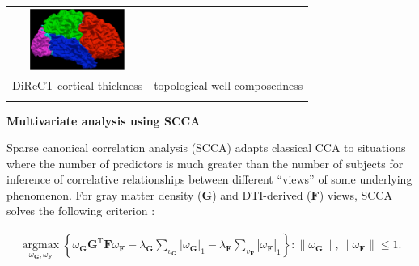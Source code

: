 \documentclass[paperwidth=48in,paperheight=48in,portrait,final]{baposter}
\begin{document}
\begin{poster}
{\begin{center}
\begin{tabular}{cc}
\includegraphics[height=20mm]{glamglue.pdf} \\
DiReCT cortical thickness \cite{Das2009} & topological well-composedness \cite{Tustison2011} \\
\vspace{-1mm}\\
\end{tabular}
\end{center}

\vspace{-6mm}

\begin{center}
{\bf Multivariate analysis using SCCA}\\
\end{center}
\vspace{-1mm}
Sparse canonical correlation analysis (SCCA) adapts classical CCA to
situations where the number of predictors is much greater than the number
of subjects for inference of correlative relationships between different
``views'' of some underlying phenomenon. For gray matter density ($\mathbf{G}$) and
DTI-derived  ($\mathbf{F}$) views, SCCA solves the following
criterion \cite{Avants2010b}:
\vspace{-7mm}
\begin{center}
\begin{align*}
\underset{\omega_{\mathbf{G}}, \omega_{\mathbf{F}}}{\operatorname{argmax}} \left\{\omega_{\mathbf{G}} \mathbf{G}^\mathrm{T}\mathbf{F}\omega_{\mathbf{F}} - \lambda_{\mathbf{G}}\sum_{v_{\mathbf{G}}} |\omega_{\mathbf{G}}|_1 - \lambda_{\mathbf{F}}\sum_{v_{\mathbf{F}}} |\omega_{\mathbf{F}}|_1\right\}: \|\omega_{\mathbf{G}}\|, \|\omega_{\mathbf{F}}\| \leq 1.
\end{align*}
\end{center}


  }


\end{poster}
\end{document}

